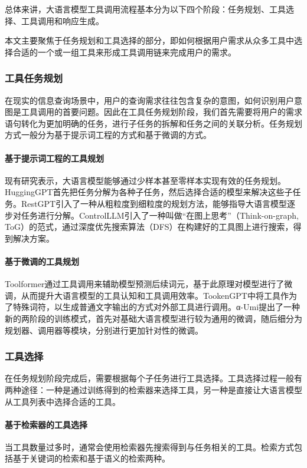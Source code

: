 总体来讲，大语言模型工具调用流程基本分为以下四个阶段：任务规划、工具选择、工具调用和响应生成\cite{Ruan2023, Shen2023, Song2023}。

本文主要聚焦于任务规划和工具选择的部分，即如何根据用户需求从众多工具中选择合适的一个或一组工具来形成工具调用链来完成用户的需求。

\subsubsection{工具任务规划}
在现实的信息查询场景中，用户的查询需求往往包含复杂的意图，如何识别用户意图是工具调用的首要问题。因此在工具任务规划阶段，我们首先需要将用户的需求语句转化为更加明确的任务，进行子任务的拆解和任务之间的关联分析。任务规划方式一般分为基于提示词工程的方式和基于微调的方式。

\paragraph{基于提示词工程的工具规划} 
现有研究\cite{Miao2023}表示，大语言模型能够通过少样本甚至零样本实现有效的任务规划。HuggingGPT\cite{Shen2023}首先把任务分解为各种子任务，然后选择合适的模型来解决这些子任务。RestGPT\cite{Song2023}引入了一种从粗粒度到细粒度的规划方法，能够指导大语言模型逐步对任务进行分解。ControlLLM\cite{Liu2023a}引入了一种叫做“在图上思考”（Think-on-graph, ToG）的范式，通过深度优先搜索算法（DFS）在构建好的工具图上进行搜索，得到解决方案。

\paragraph{基于微调的工具规划} 

Toolformer通过工具调用来辅助模型预测后续词元，基于此原理对模型进行了微调，从而提升大语言模型的工具认知和工具调用效率。TookenGPT中将工具作为了特殊词符，以生成普通文字输出的方式对外部工具进行调用。α-Umi提出了一种新的两阶段的训练模式，首先对基础大语言模型进行较为通用的微调，随后细分为规划器、调用器等模块，分别进行更加针对性的微调。

\subsubsection{工具选择}
在任务规划阶段完成后，需要根据每个子任务进行工具选择。工具选择过程一般有两种途径：一种是通过训练得到的检索器来选择工具，另一种是直接让大语言模型从工具列表中选择合适的工具。

\paragraph{基于检索器的工具选择} 
当工具数量过多时，通常会使用检索器先搜索得到与任务相关的工具。检索方式包括基于关键词的检索和基于语义的检索两种。


